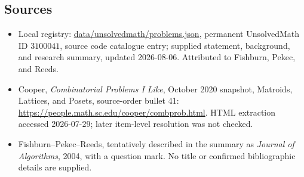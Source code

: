 \documentclass[11pt]{article}
\begin{document}
\subsection{Sources}
\begin{itemize}
\item Local registry: \url{data/unsolvedmath/problems.json}, permanent UnsolvedMath ID \(3100041\), source code catalogue entry; supplied statement, background, and research summary, updated 2026-08-06. Attributed to Fishburn, Pekec, and Reeds.
\item Cooper, \emph{Combinatorial Problems I Like}, October 2020 snapshot, Matroids, Lattices, and Posets, source-order bullet 41: \url{https://people.math.sc.edu/cooper/combprob.html}. HTML extraction accessed 2026-07-29; later item-level resolution was not checked.
\item Fishburn--Pekec--Reeds, tentatively described in the summary as \emph{Journal of Algorithms}, 2004, with a question mark. No title or confirmed bibliographic details are supplied.
\end{itemize}
\end{document}
